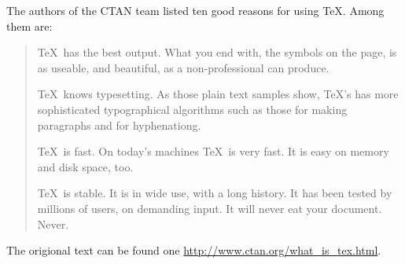 \documentclass{article}
\begin{document}
The authors of the CTAN team listed ten good reasons for using \TeX. Among them are:
\begin{quotation}
\TeX\ has the best output. What you end with, the symbols on the page, is as useable, and beautiful, as a non-professional can produce.

\TeX\ knows typesetting. As those plain text samples show, \TeX's has more sophisticated typographical algorithms such as those for making paragraphs and for hyphenationg.

\TeX\ is fast. On today's machines \TeX\ is very fast. It is easy on memory and disk space, too.

\TeX\ is stable. It is in wide use, with a long history. It has been tested by millions of users, on demanding input. It will never eat your document. Never.
\end{quotation}

The origional text can be found one \url{http://www.ctan.org/what_is_tex.html}.
\end{document}
